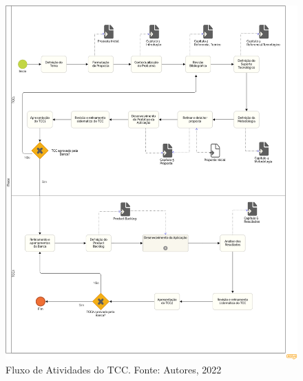 \begin{figure}[H]
    \begin{center}
        \includegraphics[scale=0.25]{figuras/Metodologia/bpmn_geral.png}
        \caption{{Fluxo de Atividades do TCC. Fonte: Autores, 2022}}
        \label{fig:bpmn_geral}
    \end{center}
\end{figure}

